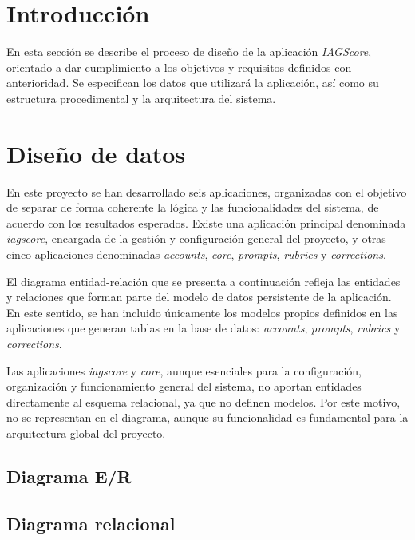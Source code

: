 
\section{Introducción}

En esta sección se describe el proceso de diseño de la aplicación \textit{IAGScore}, orientado a dar cumplimiento a los objetivos y requisitos definidos con anterioridad.  
Se especifican los datos que utilizará la aplicación, así como su estructura procedimental y la arquitectura del sistema.

\section{Diseño de datos}

En este proyecto se han desarrollado seis aplicaciones, organizadas con el objetivo de separar de forma coherente la lógica y las funcionalidades del sistema, de acuerdo con los resultados esperados.  
Existe una aplicación principal denominada \textit{iagscore}, encargada de la gestión y configuración general del proyecto, y otras cinco aplicaciones denominadas \textit{accounts}, \textit{core}, \textit{prompts}, \textit{rubrics} y \textit{corrections}.

El diagrama entidad-relación que se presenta a continuación refleja las entidades y relaciones que forman parte del modelo de datos persistente de la aplicación. En este sentido, se han incluido únicamente  los modelos propios definidos en las aplicaciones que generan tablas en la base de datos: \textit{accounts}, \textit{prompts}, \textit{rubrics} y \textit{corrections}. 

Las aplicaciones \textit{iagscore} y \textit{core}, aunque esenciales para la configuración, organización y funcionamiento general del sistema, no aportan entidades directamente al esquema relacional, ya que no definen modelos. Por este motivo, no se representan en el diagrama, aunque su funcionalidad es fundamental para la arquitectura global del proyecto.

\subsection{Diagrama E/R}

\newpage
\subsection{Diagrama relacional}

